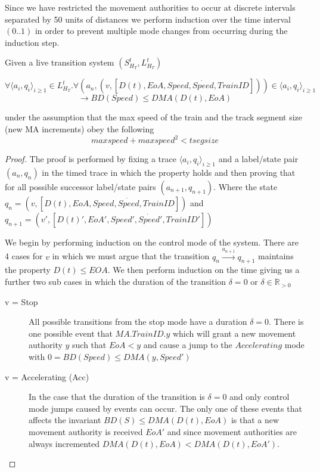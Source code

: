 Since we have restricted the movement authorities to occur at discrete intervals separated by 50 units of distances we perform induction over the time interval $(0..1)$ in order to prevent multiple mode changes from occurring during the induction step. 
\medskip
\begin{mytheorem}
Given a live transition system $(S^t_{H_{T}},  L^{t}_{H_T}) $

 $$\forall \langle a_i, q_i \rangle_{i \geq 1} \in L^{t}_{H_T}.  \forall (a_n, (v, [D(t), EoA,Speed,\dot{Speed},TrainID])) \in \langle a_i, q_i \rangle_{i \geq 1}$$ $$ \to BD(Speed) \leq DMA(D(t), EoA)$$ 

under the assumption that the max speed of the train and the track segment size (new MA increments) obey the following
                     $$maxspeed + maxspeed^2 < tsegsize$$
\begin{proof}


The proof is performed by fixing a trace $ \langle a_i, q_i \rangle_{i \geq 1}$ and  a label/state pair $(a_n, q_n)$ in the timed trace in which the property holds and then proving that for all possible successor label/state pairs $(a_{n+1},q_{n+1})$. Where  the state $q_n = (v, [D(t), EoA,Speed,\dot{Speed},TrainID])$ and $q_{n+1} = (v', [D(t)', EoA',Speed',\dot{Speed}',TrainID'])$ 

We begin by performing induction on the control mode of the system. 
There are 4 cases for $v$ in which we must argue that the transition $q_n \xrightarrow{a_{n+1}} q_{n+1}$  maintains the property $D(t) \leq EOA$. We then perform induction on the time giving us a further two sub
cases in which the duration of the transition  $\delta = 0$ or $\delta \in \mathbb{R}_{>0}$



\begin{description}
\item[v = Stop] All possible transitions from the stop mode have a duration $\delta = 0$. There is one possible event that $MA.TrainID.y$ which will grant a new movement authority $y$ such that $EoA < y$ and cause a jump to the $Accelerating$ mode with $0 = BD(Speed) \leq  DMA(y,Speed') $


\item[v = Accelerating (Acc)] In the case that the duration of the transition is $\delta = 0$ and only control mode jumps caused by events can occur. The only one of these events that affects the invariant $BD(S) \leq DMA(D(t), EoA)$ is that a new movement authority is received $EoA'$ and since movement authorities are always incremented $DMA(D(t), EoA) < DMA(D(t), EoA')$.
  

\end{description}
\end{proof}
\end{mytheorem}
